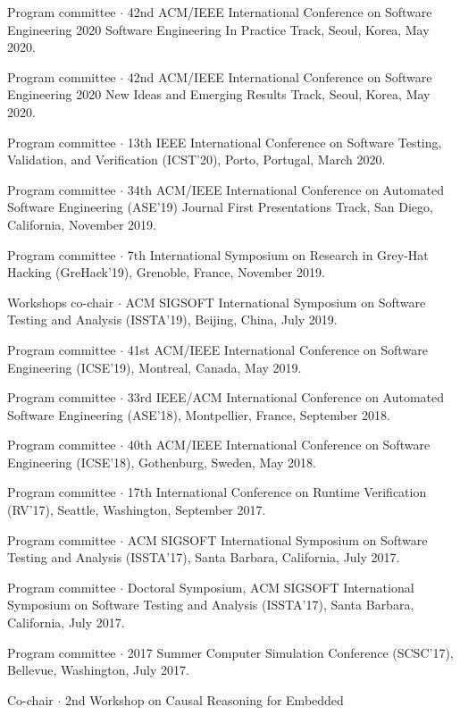 \documentclass[ComputerScience]{vita}
\begin{document}
\begin{vita}
\begin{Panel and Committee Service}
  \item Program committee $\cdot$ 42nd ACM/IEEE International Conference on 
  Software Engineering 2020 Software Engineering In Practice Track, 
  Seoul, Korea, May 2020.
\item Program committee $\cdot$ 42nd ACM/IEEE International Conference on 
  Software Engineering 2020 New Ideas and Emerging Results Track, 
  Seoul, Korea, May 2020.
\item Program committee $\cdot$ 13th IEEE International Conference on
  Software Testing, Validation, and Verification (ICST'20), Porto,
  Portugal, March 2020.
\item Program committee $\cdot$ 34th ACM/IEEE International Conference on Automated Software Engineering (ASE'19) Journal First Presentations Track, San Diego, California, November 2019.
\item Program committee $\cdot$ 7th International Symposium on
  Research in Grey-Hat Hacking (GreHack'19), Grenoble, France, 
  November 2019. 
\item Workshops co-chair $\cdot$ ACM SIGSOFT International Symposium on Software Testing and Analysis (ISSTA'19), Beijing, China, July 2019.
\item Program committee $\cdot$ 41st ACM/IEEE International Conference on Software Engineering (ICSE'19), Montreal, Canada, May 2019. 
\item Program committee $\cdot$ 33rd IEEE/ACM International Conference on Automated Software Engineering (ASE'18), Montpellier, France, September 2018.
\item Program committee $\cdot$ 40th ACM/IEEE International Conference on Software Engineering (ICSE'18), Gothenburg, Sweden, May 2018. 
\item Program committee $\cdot$ 17th International Conference on Runtime Verification (RV'17), Seattle, Washington, September 2017.
\item Program committee $\cdot$ ACM SIGSOFT International Symposium on Software Testing and Analysis (ISSTA'17), Santa Barbara, California, July 2017.
\item Program committee $\cdot$ Doctoral Symposium, ACM SIGSOFT International Symposium on Software Testing and Analysis (ISSTA'17), Santa Barbara, California, July 2017.
\item Program committee $\cdot$ 2017 Summer Computer Simulation Conference (SCSC'17), Bellevue, Washington, July 2017.
\item Co-chair $\cdot$  2nd Workshop on Causal Reasoning for Embedded

\end{Panel and Committee Service}
\end{vita}
\end{document}
